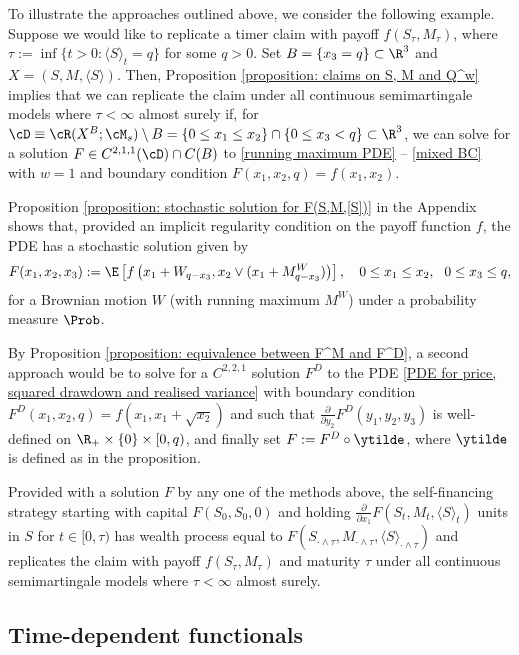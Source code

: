 \documentclass[11pt]{article}
\begin{document}
To illustrate the approaches outlined above, we consider the following example. Suppose we would like to replicate a timer claim with payoff $f(S_\tau, M_\tau)$, where $\tau := \inf\{ t > 0 : \langle S \rangle_t = q\}$ for some $q > 0$. Set $B = \{ x_3 = q\} \subset \R^3$ and $X = (S, M, \langle S \rangle)$. Then, Proposition \ref{proposition: claims on S, M and Q^w} implies that we can replicate the claim under all continuous semimartingale models where $\tau < \infty$ almost surely if, for $\cD \equiv \cR(X^B; \cM_s) \setminus B = \{0 \leq x_1 \leq x_2\} \cap \{0 \leq x_3 < q\} \subset \R^3$, we can solve for a solution $F \in C^{2,1,1}(\cD) \cap C(B)$ to \eqref{running maximum PDE} -- \eqref{mixed BC} with $w = 1$ and boundary condition $F(x_1, x_2, q) = f(x_1, x_2)$.  

Proposition \ref{proposition: stochastic solution for F(S,M,[S])} in the Appendix shows that, provided an implicit regularity condition on the payoff function $f$, the PDE has a stochastic solution given by
\begin{equation}
\label{stochastic solution for F}
F(x_1,x_2,x_3) := \E \left[ f \left( x_1 + W_{q - x_3}, x_2 \vee (x_1 + M^W_{q- x_3}) \right) \right], \quad  0 \leq x_1 \leq x_2, \ \ 0 \leq x_3 \leq q,
\end{equation}
for a Brownian motion $W$ (with running maximum $M^W$) under a probability measure $\Prob$. 

By Proposition \ref{proposition: equivalence between F^M and F^D}, a second approach would be to solve for a $C^{2,2,1}$ solution $F^D$ to the PDE \eqref{PDE for price, squared drawdown and realised variance} with boundary condition $F^D(x_1, x_2, q) = f(x_1, x_1 + \sqrt{x_2})$ and such that $\frac{\partial}{\partial y_2} F^D(y_1, y_2, y_3)$ is well-defined on $\R_+ \times \{0\} \times [0,q)$, and finally set $F := F^D \circ \ytilde$, where $\ytilde$ is defined as in the proposition.

Provided with a solution $F$ by any one of the methods above, the self-financing strategy starting with capital $F(S_0, S_0, 0)$ and holding $\frac{\partial}{\partial x_1} F(S_t, M_t, \langle S \rangle_t)$ units in $S$ for $t \in [0,\tau)$ has wealth process equal to $F(S_{\cdot \wedge \tau}, M_{\cdot \wedge \tau}, \langle S \rangle_{\cdot \wedge \tau})$ and replicates the claim with payoff $f(S_{\tau}, M_{\tau})$ and maturity $\tau$ under all continuous semimartingale models where $\tau < \infty$ almost surely.

\subsection{Time-dependent functionals}
\label{subsection: time dependent functionals}
\end{document}
